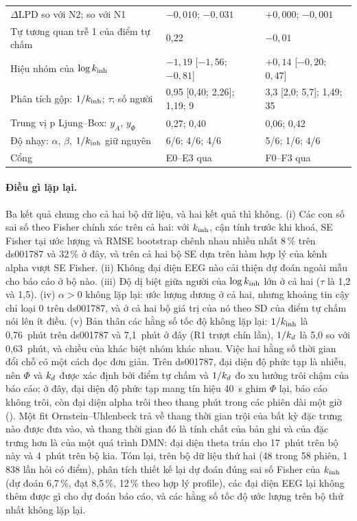 \begin{table}[htbp]
\begin{tabular}{lll}
$\Delta$LPD so với N2; so với N1         & $-0{,}010$; $-0{,}031$ & $+0{,}000$; $-0{,}001$ \\
Tự tương quan trễ 1 của điểm tự chấm     & 0,22 & $-0{,}01$ \\
Hiệu nhóm của $\log k_{\mathrm{inh}}$                & $-1{,}19$ [$-1{,}56$; $-0{,}81$] & $+0{,}14$ [$-0{,}20$; $0{,}47$] \\
Phân tích gộp: $1/k_{\mathrm{inh}}$; $\tau$; số người & 0,95 [0,40; 2,26]; 1,19; 9 & 3,3 [2,0; 5,7]; 1,49; 35 \\
Trung vị p Ljung--Box: $y_A$, $y_\Phi$   & 0,27; 0,40 & 0,06; 0,42 \\
Độ nhạy: $\alpha$, $\beta$, $1/k_{\mathrm{inh}}$ giữ nguyên & 6/6; 4/6; 4/6 & 5/6; 1/6; 4/6 \\
Cổng                                     & E0--E3 qua & F0--F3 qua \\
\bottomrule
\end{tabular}
\end{table}

\paragraph{Điều gì lặp lại.} Ba kết quả chung cho cả hai bộ dữ liệu, và hai kết quả thì không. (i) Các con số sai số theo Fisher chính xác trên cả hai: với $k_{\mathrm{inh}}$, cận tính trước khi khoá, SE Fisher tại ước lượng và RMSE bootstrap chênh nhau nhiều nhất 8\,\% trên ds001787 và 32\,\% ở đây, và trên cả hai bộ SE dựa trên hàm hợp lý của kênh alpha vượt SE Fisher. (ii) Không đại diện EEG nào cải thiện dự đoán ngoài mẫu cho báo cáo ở bộ nào. (iii) Độ dị biệt giữa người của $\log k_{\mathrm{inh}}$ lớn ở cả hai ($\tau$ là 1,2 và 1,5). (iv) $\alpha>0$ không lặp lại: ước lượng dương ở cả hai, nhưng khoảng tin cậy chỉ loại 0 trên ds001787, và ở cả hai bộ giá trị của nó theo SD của điểm tự chấm nói lên ít điều. (v) Bản thân các hằng số tốc độ không lặp lại: $1/k_{\mathrm{inh}}$ là 0,76~phút trên ds001787 và 7,1~phút ở đây (R1 trượt chín lần), $1/k_{d}$ là 5,0 so với 0,63~phút, và chiều của khác biệt nhóm khác nhau. Việc hai hằng số thời gian đổi chỗ có một cách đọc đơn giản. Trên ds001787, đại diện độ phức tạp là nhiễu, nên $\Phi$ và $k_{d}$ được xác định bởi điểm tự chấm và $1/k_{d}$ đo xu hướng trôi chậm của báo cáo; ở đây, đại diện độ phức tạp mang tín hiệu 40~s ghim $\Phi$ lại, báo cáo không trôi, còn đại diện alpha trôi theo thang phút trong các phiên dài một giờ (). Một fit Ornstein--Uhlenbeck trả về thang thời gian trội của bất kỳ đặc trưng nào được đưa vào, và thang thời gian đó là tính chất của bản ghi và của đặc trưng hơn là của một quá trình DMN: đại diện theta trán cho 17~phút trên bộ này và 4~phút trên bộ kia. Tóm lại, trên bộ dữ liệu thứ hai (48 trong 58 phiên, 1\,838 lần hỏi có điểm), phân tích thiết kế lại dự đoán đúng sai số Fisher của $k_{\mathrm{inh}}$ (dự đoán 6,7\,\%, đạt 8,5\,\%, 12\,\% theo hợp lý profile), các đại diện EEG lại không thêm được gì cho dự đoán báo cáo, và các hằng số tốc độ ước lượng trên bộ thứ nhất không lặp lại.

